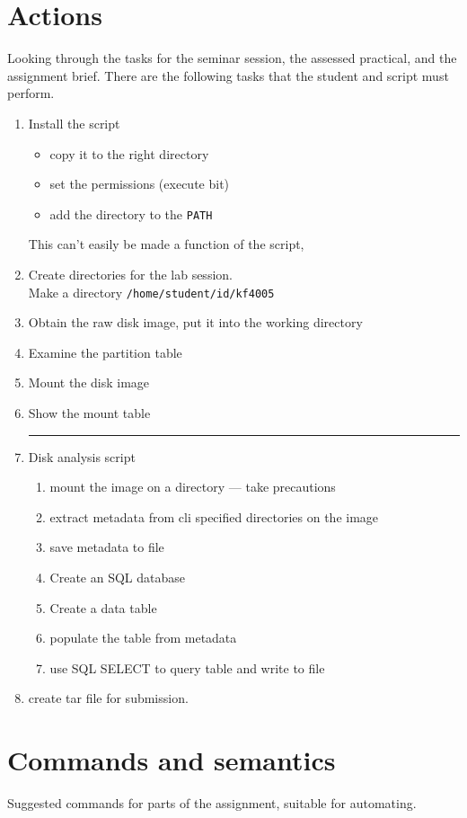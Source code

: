 \documentclass[12pt]{article}
\begin{document}
\section{Actions}
Looking through the tasks for the seminar session, the assessed practical, and the assignment brief.
There are the following tasks that the student and script must perform.
\begin{enumerate}
	\item Install the script
		\begin{itemize}
			\item copy it to the right directory
			\item set the permissions (execute bit)
			\item add the directory to the \verb:PATH:
		\end{itemize}
		This can't easily be made a function of the script,
	\item Create directories for the lab session.\\
		Make a directory \texttt{/home/student/id/kf4005}
	\item Obtain the raw disk image, put it into the working directory
	\item Examine the partition table
	\item Mount the disk image
	\item Show the mount table
	\\\hrule
	\item Disk analysis script
	\begin{enumerate}
		\item mount the image on a directory --- take precautions
		\item extract metadata from cli specified directories on the image
		\item save metadata to file
		\item Create an SQL database
		\item Create a data table
		\item populate the table from metadata
		\item use SQL SELECT to query table and write to file
	\end{enumerate}
	\item create tar file for submission.	
\end{enumerate}

\section{Commands and semantics}
Suggested commands for parts of the assignment, suitable for automating.
\end{document}
